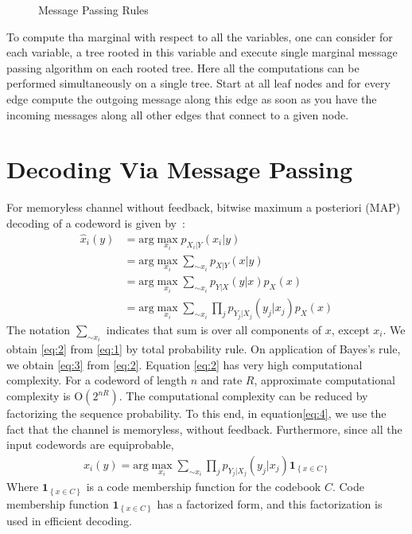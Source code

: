 \begin{figure}[t]
\begin{center}

\end{center}
\caption{Message Passing Rules \label{fig:rules}}
\end{figure}
To compute tha marginal with respect to all the variables, one can consider for each variable, a tree rooted in this variable and execute single marginal message passing algorithm 
on each rooted tree. Here all the computations can be performed simultaneously on a single tree. Start at all leaf nodes and for every edge compute the outgoing message along this
edge as soon as you have the incoming messages along all other edges that connect to a given node.
\section{Decoding Via Message Passing}
For memoryless channel without feedback, bitwise maximum a posteriori (MAP) decoding of a codeword is given by~\cite{mct}:  
\begin{align}
\hat x_i( y) &= \text{arg} \max_{x_i}p_{X_{i}|Y}(x_{i}| y) \label{eq:1}\\
\ &= \text{arg} \max_{x_i}\sum_{\sim x_i}p_{X|Y}( x| y) \label{eq:2}\\
\ &= \text{arg} \max_{x_i}\sum_{\sim x_i}p_{Y|X}( y| x)p_{X}( x) \label{eq:3}\\
\ &= \text{arg} \max_{x_i}\sum_{\sim x_i}\prod_{j}p_{Y_j|X_j}(y_j|x_j)p_{X}( x)\label{eq:4}
\end{align}
The notation $\sum_{\sim x_i}$ indicates that sum is over all components of $x$, except $x_i$. 
We obtain \eqref{eq:2} from \eqref{eq:1} by total probability rule. On application of Bayes's rule,
we obtain \eqref{eq:3} from \eqref{eq:2}.
Equation \eqref{eq:2} has very high computational complexity.
For a codeword of length $n$ and rate $R$, approximate computational complexity is $\mathrm{O} (2^{nR})$. 
The computational complexity can be reduced by factorizing the sequence probability. To this end, in equation\eqref{eq:4}, 
we use the fact that the channel is memoryless, without feedback. Furthermore, since all the input codewords are equiprobable,
\begin{align}
\hat x_i(y) = \text{arg} \max_{x_i}\sum_{\sim x_i}\prod_{j}p_{Y_j|X_j}(y_j|x_j)\mathbf{1}_{\left\lbrace x\in C\right\rbrace} \label{eq:5}
\end{align} 
Where $\mathbf{1}_{\left\lbrace x\in C\right\rbrace}$ is a code membership function for the codebook $C$. Code membership function $\mathbf{1}_{\left\lbrace x\in C\right\rbrace}$
has a factorized form, and this factorization is used in efficient decoding.

